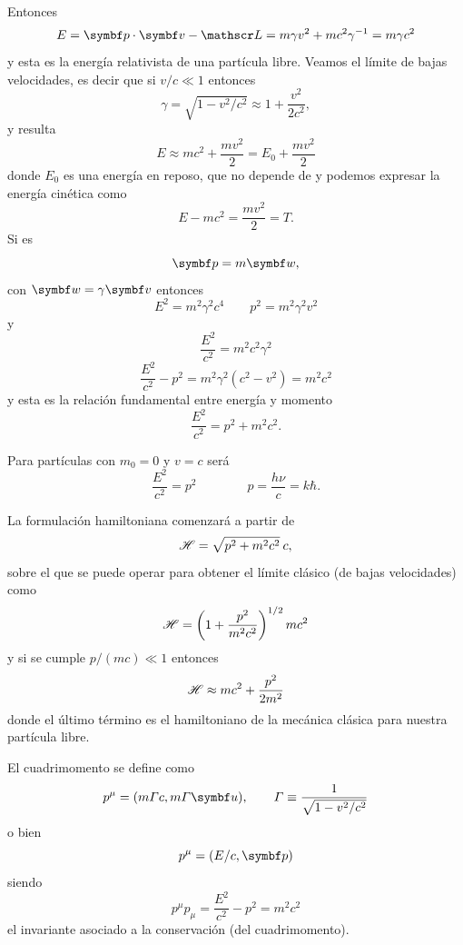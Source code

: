 \documentclass[10pt,oneside]{CBFT_book}
\begin{document}
Entonces
\[
	E = \pe{p}{v} - \Lag = m \gamma v^2 + m c^2 \gamma^{-1} = m \gamma c^2
\]
y esta es la energía relativista de una partícula libre. Veamos el límite de bajas velocidades, es decir
que si $v/c \ll 1$ entonces 
\[
	\gamma = \sqrt{ 1 - v^2/c^2 } \approx 1 + \frac{v^2}{2c^2},
\]
y resulta 
\[
	E \approx  m c^2 + \frac{m v^2}{2} = E_0 + \frac{m v^2}{2}
\]
donde $E_0$ es una energía en reposo, que no depende de  y podemos expresar la energía cinética como 
\[
	E - m c^2 = \frac{m v^2}{2} = T.
\]
Si es 
\[
	\vb{p} = m \vb{w},
\]
con $\vb{w} = \gamma \vb{v}$ entonces 
\[
	E^2 = m^2 \gamma^2 c^4 \qquad p^2 = m^2 \gamma^2 v^2 
\]
y
\[
	\frac{E^2}{c^2} = m^2 c^2 \gamma^2
\]
\[
	\frac{E^2}{c^2} - p^2 = m^2 \gamma^2 (c^2 -v^2) = m^2 c^2
\]
y esta es la relación fundamental entre energía y momento 
\[
	\frac{E^2}{c^2} = p^2 + m^2c^2.
\]

Para partículas con $m_0 = 0$ y $v=c$ será 
\[
	\frac{E^2}{c^2} = p^2 \qquad \qquad p = \frac{h\nu}{c} = k\hbar.
\]

La formulación hamiltoniana comenzará a partir de 
\[
	\mathscr{H} = \sqrt{ p^2 + m^2 c^2} \: c,
\]
sobre el que se puede operar para obtener el límite clásico (de bajas velocidades) como 
\[
	\mathscr{H} = \left( 1 + \frac{ p^2 }{ m^2 c^2 } \right)^{1/2} m c^2
\]
y si se cumple $ p/(mc) \ll 1$ entonces 
\[
	\mathscr{H} \approx mc^2 + \frac{ p^2 }{2m^2}
\]
donde el último término  es el hamiltoniano de la mecánica clásica para nuestra partícula
libre.

El cuadrimomento se define como 
\[
	p^\mu = ( m\Gamma c , m \Gamma \vb {u}), \qquad \Gamma \equiv \frac{ 1 }{ \sqrt{ 1 - v^2/c^2 } } 
\]
o bien 
\[
	p^\mu = ( E/c , \vb{p} )
\]
siendo 
\[
	p^\mu p_\mu = \frac{E^2}{c^2} - p^2 = m^2 c^2
\]
el invariante asociado a la conservación (del cuadrimomento).
\end{document}
